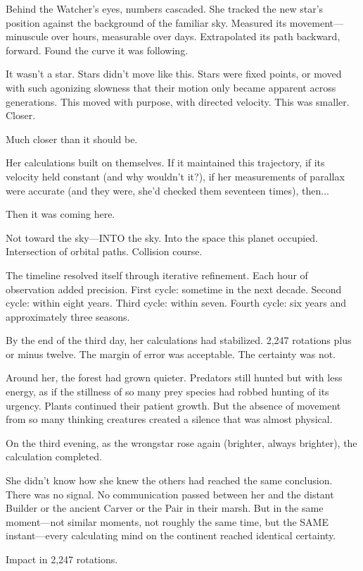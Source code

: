 Behind the Watcher's eyes, numbers cascaded. She tracked the new star's position against the background of the familiar sky. Measured its movement—minuscule over hours, measurable over days. Extrapolated its path backward, forward. Found the curve it was following.

It wasn't a star. Stars didn't move like this. Stars were fixed points, or moved with such agonizing slowness that their motion only became apparent across generations. This moved with purpose, with directed velocity. This was smaller. Closer.

Much closer than it should be.

Her calculations built on themselves. If it maintained this trajectory, if its velocity held constant (and why wouldn't it?), if her measurements of parallax were accurate (and they were, she'd checked them seventeen times), then...

Then it was coming here.

Not toward the sky—INTO the sky. Into the space this planet occupied. Intersection of orbital paths. Collision course.

The timeline resolved itself through iterative refinement. Each hour of observation added precision. First cycle: sometime in the next decade. Second cycle: within eight years. Third cycle: within seven. Fourth cycle: six years and approximately three seasons.

By the end of the third day, her calculations had stabilized. 2,247 rotations plus or minus twelve. The margin of error was acceptable. The certainty was not.

Around her, the forest had grown quieter. Predators still hunted but with less energy, as if the stillness of so many prey species had robbed hunting of its urgency. Plants continued their patient growth. But the absence of movement from so many thinking creatures created a silence that was almost physical.

On the third evening, as the wrongstar rose again (brighter, always brighter), the calculation completed.

She didn't know how she knew the others had reached the same conclusion. There was no signal. No communication passed between her and the distant Builder or the ancient Carver or the Pair in their marsh. But in the same moment—not similar moments, not roughly the same time, but the SAME instant—every calculating mind on the continent reached identical certainty.

Impact in 2,247 rotations.

